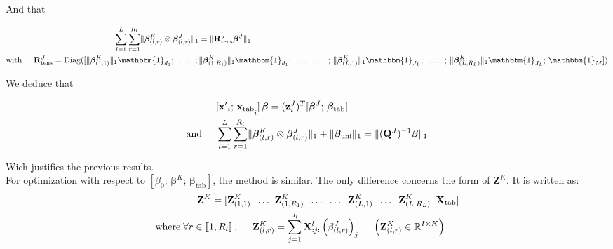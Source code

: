 \documentclass[preprint,12pt]{elsarticle}
\begin{document}
And that

\begin{align}
    \sum\limits_{l = 1}^L \sum\limits_{r = 1}^{R_l} \lVert \bm{\beta}_{(l,r)}^K \otimes \bm{\beta}_{(l,r)}^J \rVert_1                                            & = \lVert \mathbf{R}_{\text{tens}}^J \bm{\beta}^J\rVert_1                                                                                                                                                                                                  \\
    \text{with} \hspace{0.5 cm} \mathbf{R}_{\text{tens}}^J = \text{Diag}    ([\lVert \bm{\beta}_{(1,1)}^K \rVert_1 \mathbbm{1}_{d_1}; \; \; \hdots \; \;; \, & \lVert \bm{\beta}_{(1,R_1)}^K \rVert_1 \mathbbm{1}_{d_1};  \; \; \hdots \; \;  \hdots \; \; ;\, \lVert \bm{\beta}_{(L,1)}^K \rVert_1 \mathbbm{1}_{J_L};  \; \;  \hdots \; \; ;\, \lVert \bm{\beta}_{(L,R_L)}^K \rVert_1 \mathbbm{1}_{J_L}; \, \mathbbm{1}_M])
\end{align}

\noindent We deduce that

\begin{align}
                               & [{\mathbf{x}'}_i; \, \mathbf{x}_{\text{tab}\raisebox{-4pt}{$\scriptstyle i$}}]\, \bm{\beta}= (\mathbf{z}_i^J)^T [\bm{\beta}^J; \, \bm{\beta}_{\text{tab}}]                                 \\
    \text{and} \hspace{0.5 cm} & \sum\limits_{l = 1}^L \sum\limits_{r = 1}^{R_l} \lVert \bm{\beta}_{(l,r)}^K \otimes \bm{\beta}_{(l,r)}^J \rVert_1 + \lVert \bm{\beta}_{\text{uni}} \rVert_1= \lVert (\mathbf{Q}^J)^{-1} \bm{\beta} \rVert_1
\end{align}

\noindent Wich justifies the previous results.\\[5 pt]
\noindent For optimization with respect to $\left[ \beta_0 ;\, \bm{\beta}^K ;\,  \bm{\beta}_{\text{tab}} \right]$, the method is similar. The only difference concerns the form of $\mathbf{Z}^K$. It is written as:
\begin{align}
    \mathbf{Z}^K	=[ \mathbf{Z}_{(1,1)}^K \; \; \hdots \; \;                                          & \mathbf{Z}_{(1,R_1)}^K  \; \; \hdots  \; \; \hdots \; \; \mathbf{Z}_{(L,1)}^K \; \; \hdots \; \; \mathbf{Z}_{(L,R_L)}^K \; \; \mathbf{X}_{\text{tab}}] \label{eqref: Z^K}               \\
    \text{where} \; \forall r \in \llbracket 1, R_l\rrbracket\, , \hspace{0.5 cm} \mathbf{Z}_{(l,r)}^K & = \sum\limits_{j = 1}^{J_l} \mathbf{X}_{:j:}^l \left(\beta_{(l,r)}^J\right)_j \hspace{0.5 cm} \left(\mathbf{Z}_{(l,r)}^K \in \mathbb{R}^{I \times K}\right) \label{eqref: Z_tens^K}
\end{align}
\end{document}
